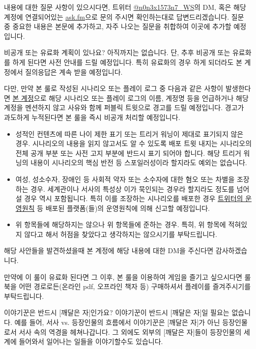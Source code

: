 \documentclass{report}
\begin{document}
	내용에 대한 질문 사항이 있으시다면, 트위터 \href{https://www.twitter.com/n0n3x1573n7_WS}{@n0n3x1573n7\_WS}의 DM, 혹은 해당 계정에 연결되어있는 \href{https://ask.fm/n0n3x1573n7_WS}{ask.fm}으로 문의 주시면 확인하는대로 답변드리겠습니다. 질문 중 중요한 내용은 본문에 추가하고, 자주 나오는 질문을 취합하여 이곳에 추가할 예정입니다.
	
	\bigskip
	
	\begin{faq}{비공개 또는 유료화 계획이 있나요?}
		아직까지는 없습니다. 단, 추후 비공개 또는 유료화를 하게 된다면 사전 안내를 드릴 예정입니다. 특히 유료화의 경우 하게 되더라도 본 계정에서 질의응답은 계속 받을 예정입니다.
		
		다만, 만약 본 룰로 작성된 시나리오 또는 플레이 로그 중 다음과 같은 사항이 발생한다면 \href{https://twitter.com/n0n3x1573n7_WS}{본 계정}으로 해당 시나리오 또는 플레이 로그의 이름, 계정명 등을 언급하거나 해당 계정을 멘션하지 않고 사유와 함께 퍼블릭 트윗으로 경고를 드릴 예정입니다. 경고가 과도하게 누적된다면 본 룰을 즉시 비공개 처리할 예정입니다.
		\begin{itemize}
			\item 성적인 컨텐츠에 따른 나이 제한 표기 또는 트리거 워닝이 제대로 표기되지 않은 경우. 시나리오의 내용을 읽지 않고서도 알 수 있도록 배포 트윗 내지는 시나리오의 전체 공개 부분 또는 사전 고지 부분에 반드시 표기 되어야 합니다. 해당 트리거 워닝의 내용이 시나리오의 핵심 반전 등 스포일러성이라 할지라도 예외는 없습니다.
			\item 여성, 성소수자, 장애인 등 사회적 약자 또는 소수자에 대한 혐오 또는 차별을 조장하는 경우. 세계관이나 서사의 특성상 이가 묵인되는 경우라 할지라도 정도를 넘어설 경우 역시 포함됩니다. 특히 이를 조장하는 시나리오를 배포한 경우 \href{https://help.twitter.com/ko/rules-and-policies/hateful-conduct-policy}{트위터의 운영원칙} 등 배포된 플랫폼(들)의 운영원칙에 의해 신고할 예정입니다.
			\item 위 항목들에 해당하지는 않으나 위 항목들에 준하는 경우. 특히, 위 항목에 적혀있지 않다고 해서 허점을 찾았다고 생각하지는 않으시기를 부탁드립니다.
		\end{itemize}
		해당 사안들을 발견하셨을때 본 계정에 해당 내용에 대한 DM을 주신다면 감사하겠습니다.
		
		만약에 이 룰이 유료화 된다면 그 이후, 본 룰을 이용하여 게임을 즐기고 싶으시다면 룰북을 어떤 경로로든(온라인 pdf, 오프라인 책자 등) 구매하셔서 플레이를 즐겨주시기를 부탁드립니다.
	\end{faq}
	
	\begin{faq}{이야기꾼은 반드시 [깨달은 자]인가요?}
		이야기꾼이 반드시 [깨달은 자]일 필요는 없습니다. 예를 들어, 서사 vs. 등장인물의 흐름에서 이야기꾼은 [깨달은 자]가 아닌 등장인물로서 서사 속의 역경을 헤쳐나갑니다. 그 외에도 외부의 [깨달은 자]들이 등장인물의 세계에 들어와서 일어나는 일들을 이야기할수도 있습니다.
	\end{faq}
	
\end{document}
